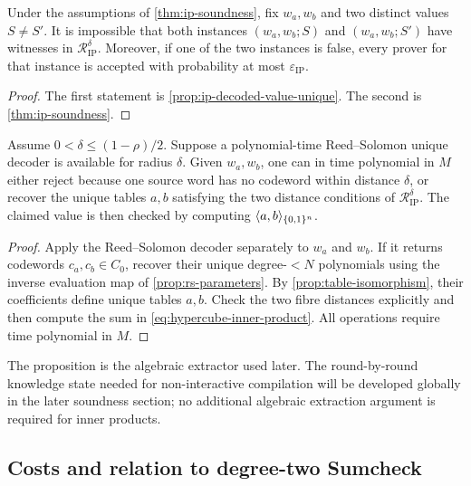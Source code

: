 \begin{corollary}
\label{cor:ip-binding}
Under the assumptions of \cref{thm:ip-soundness}, fix $w_a,w_b$ and two distinct values $S\ne S'$.  It is impossible that both instances $(w_a,w_b;S)$ and $(w_a,w_b;S')$ have witnesses in $\mathcal R^{\delta}_{\mathrm{IP}}$.  Moreover, if one of the two instances is false, every prover for that instance is accepted with probability at most $\varepsilon_{\mathrm{IP}}$.
\end{corollary}

\begin{proof}
The first statement is \cref{prop:ip-decoded-value-unique}.  The second is \cref{thm:ip-soundness}.
\end{proof}

\begin{proposition}
\label{prop:ip-decoding-extractor}
Assume $0<\delta\le(1-\rho)/2$.  Suppose a polynomial-time Reed--Solomon unique decoder is available for radius $\delta$.  Given $w_a,w_b$, one can in time polynomial in $M$ either reject because one source word has no codeword within distance $\delta$, or recover the unique tables $a,b$ satisfying the two distance conditions of $\mathcal R^{\delta}_{\mathrm{IP}}$.  The claimed value is then checked by computing $\langle a,b\rangle_{\{0,1\}^n}$.
\end{proposition}

\begin{proof}
Apply the Reed--Solomon decoder separately to $w_a$ and $w_b$.  If it returns codewords $c_a,c_b\in C_0$, recover their unique degree-$<N$ polynomials using the inverse evaluation map of \cref{prop:rs-parameters}.  By \cref{prop:table-isomorphism}, their coefficients define unique tables $a,b$.  Check the two fibre distances explicitly and then compute the sum in \eqref{eq:hypercube-inner-product}.  All operations require time polynomial in $M$.
\end{proof}

The proposition is the algebraic extractor used later.  The round-by-round knowledge state needed for non-interactive compilation will be developed globally in the later soundness section; no additional algebraic extraction argument is required for inner products.

\subsection{Costs and relation to degree-two Sumcheck}
\label{sec:ip-costs}

